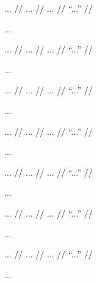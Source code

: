 \documentclass[12pt,paper=a4]{scrartcl}
\begin{document}

\ex \begingl
	\glpreamble ... //
	\gla ... //
	\glb ... //
	\glft \enquote{...} //
\endgl \xe

...


\ex \begingl
	\glpreamble ... //
	\gla ... //
	\glb ... //
	\glft \enquote{...} //
\endgl \xe

...


\ex \begingl
	\glpreamble ... //
	\gla ... //
	\glb ... //
	\glft \enquote{...} //
\endgl \xe

...


\ex \begingl
	\glpreamble ... //
	\gla ... //
	\glb ... //
	\glft \enquote{...} //
\endgl \xe

...


\ex \begingl
	\glpreamble ... //
	\gla ... //
	\glb ... //
	\glft \enquote{...} //
\endgl \xe

...


\ex \begingl
	\glpreamble ... //
	\gla ... //
	\glb ... //
	\glft \enquote{...} //
\endgl \xe

...


\ex \begingl
	\glpreamble ... //
	\gla ... //
	\glb ... //
	\glft \enquote{...} //
\endgl \xe

...
\end{document}
